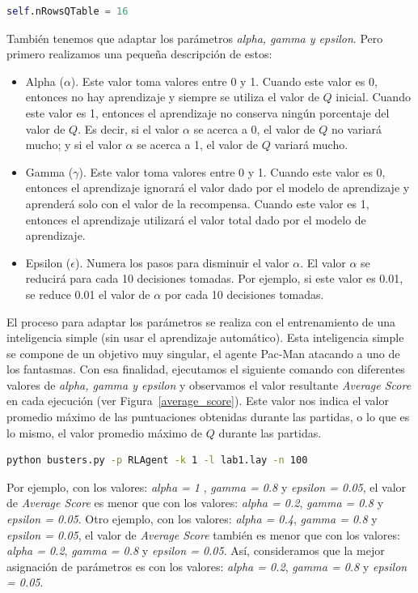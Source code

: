 \documentclass[11pt]{exam}
\begin{document}
\begin{lstlisting}[language=python, basicstyle=\footnotesize]
self.nRowsQTable = 16
\end{lstlisting}

También tenemos que adaptar los parámetros \textit{alpha, gamma y epsilon}. Pero primero realizamos una pequeña descripción de estos:

\begin{itemize}
	\item Alpha ($\alpha$). Este valor toma valores entre 0 y 1. Cuando este valor es 0, entonces no hay aprendizaje y siempre se utiliza el valor de $Q$ inicial. Cuando este valor es 1, entonces el aprendizaje no conserva ningún porcentaje del valor de $Q$. Es decir, si el valor $\alpha$ se acerca a 0, el valor de $Q$ no variará mucho; y si el valor $\alpha$ se acerca a 1, el valor de $Q$ variará mucho.
	\item Gamma ($\gamma$). Este valor toma valores entre 0 y 1. Cuando este valor es 0, entonces el aprendizaje ignorará el valor dado por el modelo de aprendizaje y aprenderá solo con el valor de la recompensa. Cuando este valor es 1, entonces el aprendizaje utilizará el valor total dado por el modelo de aprendizaje.
	\item Epsilon ($\epsilon$). Numera los pasos para disminuir el valor $\alpha$. El valor $\alpha$ se reducirá para cada 10 decisiones tomadas. Por ejemplo, si este valor es 0.01, se reduce 0.01 el valor de $\alpha$ por cada 10 decisiones tomadas.
\end{itemize}

El proceso para adaptar los parámetros se realiza con el entrenamiento de una inteligencia simple (sin usar el aprendizaje automático). Esta inteligencia simple se compone de un objetivo muy singular, el agente Pac-Man atacando a uno de los fantasmas. Con esa finalidad, ejecutamos el siguiente comando con diferentes valores de \textit{alpha, gamma y epsilon} y observamos el valor resultante \textit{Average Score} en cada ejecución (ver Figura~\ref{average_score}). Este valor nos indica el valor promedio máximo de las puntuaciones obtenidas durante las partidas, o lo que es lo mismo, el valor promedio máximo de $Q$ durante las partidas.

\begin{lstlisting}[language=bash, basicstyle=\footnotesize]
python busters.py -p RLAgent -k 1 -l lab1.lay -n 100
\end{lstlisting}

Por ejemplo, con los valores: \textit{alpha = 1} , \textit{gamma = 0.8} y \textit{epsilon = 0.05}, el valor de \textit{Average Score} es menor que con los valores: \textit{alpha = 0.2}, \textit{gamma = 0.8} y \textit{epsilon = 0.05}. Otro ejemplo, con los valores: \textit{alpha = 0.4}, \textit{gamma = 0.8} y \textit{epsilon = 0.05}, el valor de \textit{Average Score} también es menor que con los valores: \textit{alpha = 0.2}, \textit{gamma = 0.8} y \textit{epsilon = 0.05}. Así, consideramos que la mejor asignación de parámetros es con los valores: \textit{alpha = 0.2}, \textit{gamma = 0.8} y \textit{epsilon = 0.05}.
\end{document}
